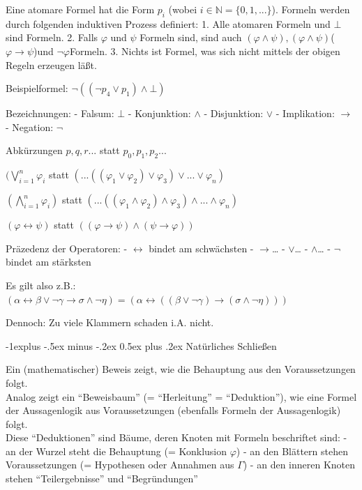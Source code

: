 \documentclass[a4paper]{article}
\makeatletter
\renewcommand{\subsection}{\@startsection{subsection}{2}{0mm}%
                {-1explus -.5ex minus -.2ex}%
                {0.5ex plus .2ex}%
                {\normalfont\normalsize\bfseries}}
\makeatother
\begin{document}
\begin{multicols}{3}
  Eine atomare Formel hat die Form $p_i$ (wobei
  $i\in\mathbb{N}=\{0,1,...\}$). Formeln werden durch folgenden induktiven
  Prozess definiert: 1. Alle atomaren Formeln und $\bot$ sind Formeln. 2.
  Falls $\varphi$ und $\psi$ Formeln sind, sind auch
  $(\varphi\wedge\psi),(\varphi\wedge\psi)$($\varphi \rightarrow\psi$)und
  $\lnot\varphi$Formeln. 3. Nichts ist Formel, was sich nicht mittels der
  obigen Regeln erzeugen läßt.

  Beispielformel: $\lnot((\lnot p_4 \vee p_1)\wedge\bot)$

  Bezeichnungen: - Falsum: $\bot$ - Konjunktion: $\wedge$ - Disjunktion:
  $\vee$ - Implikation: $\rightarrow$ - Negation: $\lnot$

  Abkürzungen $p,q,r...$ statt $p_0,p_1,p_2...$

  $(\bigvee_{i=1}^n \varphi_i$ statt
  $(...((\varphi_1\vee\varphi_2)\vee\varphi_3)\vee...\vee\varphi_n)$

  $(\bigwedge_{i=1}^n \varphi_i)$ statt
  $(...((\varphi_1\wedge\varphi_2)\wedge\varphi_3)\wedge...\wedge\varphi_n)$

  $(\varphi \leftrightarrow \psi)$ statt
  $((\varphi\rightarrow\psi)\wedge(\psi\rightarrow\varphi))$

  Präzedenz der Operatoren: - $\leftrightarrow$ bindet am schwächsten -
  $\rightarrow$\ldots{} - $\vee$\ldots{} - $\wedge$\ldots{} - $\lnot$
  bindet am stärksten

  Es gilt also z.B.:
  $(\alpha\leftrightarrow\beta\vee\lnot\gamma\rightarrow\sigma\wedge\lnot\eta) = (\alpha\leftrightarrow ((\beta\vee\lnot\gamma)\rightarrow(\sigma\wedge\lnot\eta)))$

  Dennoch: Zu viele Klammern schaden i.A. nicht.

  \subsection{Natürliches Schließen}\label{natuxfcrliches-schlieuxdfen}

  Ein (mathematischer) Beweis zeigt, wie die Behauptung aus den
  Voraussetzungen folgt.\\Analog zeigt ein ``Beweisbaum'' (=
  ``Herleitung'' = ``Deduktion''), wie eine Formel der Aussagenlogik aus
  Voraussetzungen (ebenfalls Formeln der Aussagenlogik) folgt.\\Diese
  ``Deduktionen'' sind Bäume, deren Knoten mit Formeln beschriftet sind: -
  an der Wurzel steht die Behauptung (= Konklusion $\varphi$) - an den
  Blättern stehen Voraussetzungen (= Hypothesen oder Annahmen aus
  $\Gamma$) - an den inneren Knoten stehen ``Teilergebnisse'' und
  ``Begründungen''



\end{multicols}
\end{document}
